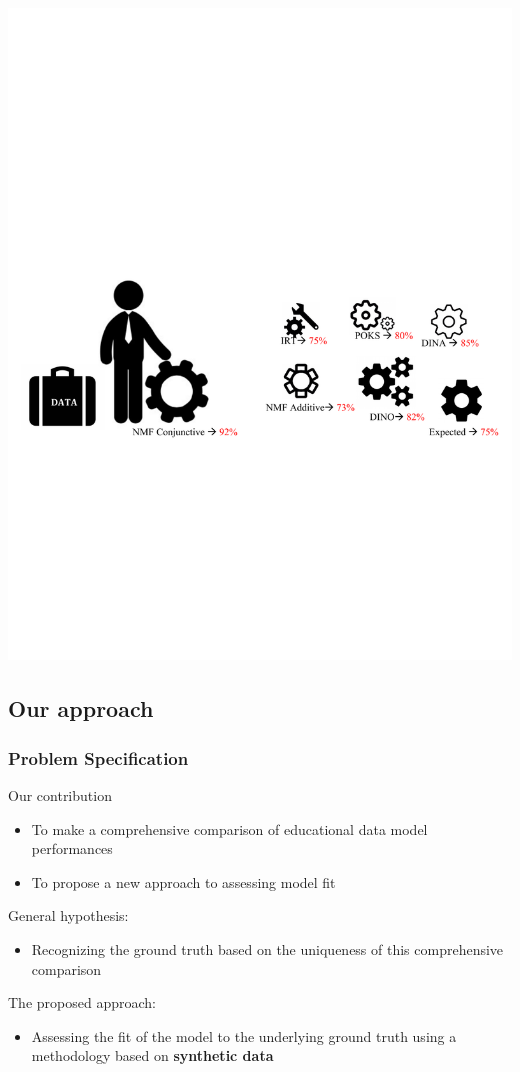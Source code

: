 \documentclass{beamer}
\begin{document}
\begin{frame}
\begin{overprint}
       \includegraphics[trim= 0cm 5cm 0cm 2.5cm , scale =0.5]{images/Model-Selected}
\end{overprint}
\end{frame}

\subsection{Our approach}
\begin{frame}\frametitle{Problem Specification}
Our contribution
\begin{itemize}
\item To make a comprehensive comparison of educational data model performances
\item To propose a new approach to assessing model fit \pause
\end{itemize}
General hypothesis:
\begin{itemize}
\item Recognizing the ground truth based on the uniqueness of this comprehensive comparison \pause
\end{itemize}
The proposed approach:
\begin{itemize}
\item Assessing the fit of the model to the underlying ground truth using a methodology based on \textbf{synthetic data} 
\end{itemize}
\end{frame}
\end{document}
